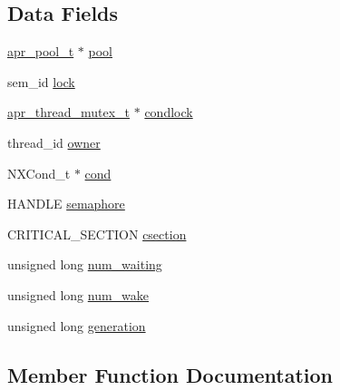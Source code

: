\subsection*{Data Fields}
\begin{DoxyCompactItemize}
\item 
\hyperlink{structapr__pool__t}{apr\+\_\+pool\+\_\+t} $\ast$ \hyperlink{structapr__thread__cond__t_a9acc87c02ac47f686e8ac08bc54e342c}{pool}
\item 
sem\+\_\+id \hyperlink{structapr__thread__cond__t_a38b58aa41283eb7a3bfca1e27851d191}{lock}
\item 
\hyperlink{structapr__thread__mutex__t}{apr\+\_\+thread\+\_\+mutex\+\_\+t} $\ast$ \hyperlink{structapr__thread__cond__t_aa1e52ba4fcce1d25fb9bd4010a962aa9}{condlock}
\item 
thread\+\_\+id \hyperlink{structapr__thread__cond__t_a2e81addb219b81eb7a10800885a6d79b}{owner}
\item 
N\+X\+Cond\+\_\+t $\ast$ \hyperlink{structapr__thread__cond__t_a335a998871670b3a49e717da3ca0e7b4}{cond}
\item 
H\+A\+N\+D\+LE \hyperlink{structapr__thread__cond__t_a9351e58b30537e3a784a2614e25f503a}{semaphore}
\item 
C\+R\+I\+T\+I\+C\+A\+L\+\_\+\+S\+E\+C\+T\+I\+ON \hyperlink{structapr__thread__cond__t_ac3e75412c3e2e48abb838e67580f5795}{csection}
\item 
unsigned long \hyperlink{structapr__thread__cond__t_a11fa71f2dc049089bc54d209a4a73416}{num\+\_\+waiting}
\item 
unsigned long \hyperlink{structapr__thread__cond__t_a19a1c7aa4e00c9c9ed39784426ceac7f}{num\+\_\+wake}
\item 
unsigned long \hyperlink{structapr__thread__cond__t_a149ed22fd09a2b0e196afa6f4a9514d0}{generation}
\end{DoxyCompactItemize}


\subsection{Member Function Documentation}
